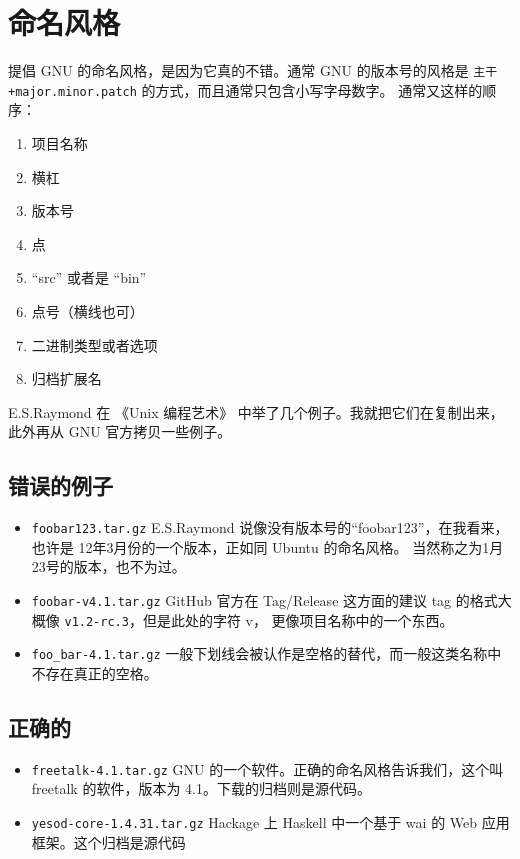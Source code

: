 \documentclass{ctexart}
\begin{document}
\section{命名风格}

提倡 GNU 的命名风格，是因为它真的不错。通常 GNU 的版本号的风格是 \verb|主干+major.minor.patch| 的方式，而且通常只包含小写字母数字。
通常又这样的顺序：
\begin{enumerate}
\item 项目名称
\item 横杠
\item 版本号
\item 点
\item “src” 或者是 “bin”
\item 点号（横线也可）
\item 二进制类型或者选项
\item 归档扩展名
\end{enumerate}

E.S.Raymond 在 《Unix 编程艺术》 中举了几个例子。我就把它们在复制出来，此外再从 GNU 官方拷贝一些例子。

\subsection{错误的例子}
\begin{itemize}
	\item  \verb|foobar123.tar.gz| E.S.Raymond 说像没有版本号的“foobar123”，在我看来，也许是 12年3月份的一个版本，正如同 Ubuntu 的命名风格。
		当然称之为1月23号的版本，也不为过。
	\item \verb|foobar-v4.1.tar.gz| GitHub 官方在 Tag/Release 这方面的建议 tag 的格式大概像 \verb|v1.2-rc.3|，但是此处的字符 v，
		更像项目名称中的一个东西。
	\item \verb|foo_bar-4.1.tar.gz| 一般下划线会被认作是空格的替代，而一般这类名称中 不存在真正的空格。
\end{itemize}


\subsection{正确的}
\begin{itemize}
	\item \verb|freetalk-4.1.tar.gz| GNU 的一个软件。正确的命名风格告诉我们，这个叫 freetalk 的软件，版本为 4.1。下载的归档则是源代码。
	\item \verb|yesod-core-1.4.31.tar.gz|  Hackage 上 Haskell 中一个基于 wai 的 Web 应用框架。这个归档是源代码
\end{itemize}
\end{document}
